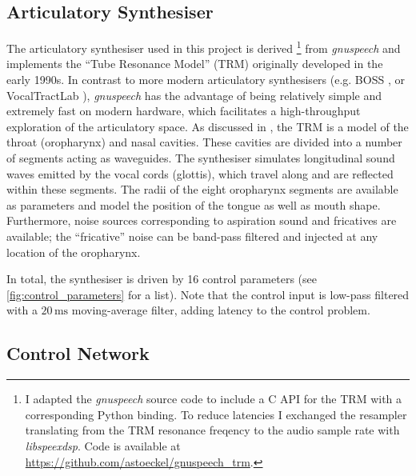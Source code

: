 \documentclass[letterpaper,10pt,conference]{ieeeconf}
\begin{document}
\subsection{Articulatory Synthesiser}

The articulatory synthesiser used in this project is derived%
\footnote{I adapted the \emph{gnuspeech} source code to include a C API for the TRM with a corresponding Python binding. To reduce latencies I exchanged the resampler translating from the TRM resonance freqency to the audio sample rate with \emph{libspeexdsp}. Code is available at \url{https://github.com/astoeckel/gnuspeech_trm}.}
from \emph{gnuspeech} \cite{hill1995realtime,hill2015gnuspeech} and implements the \enquote{Tube Resonance Model} (TRM) originally developed in the early 1990s. In contrast to more modern articulatory synthesisers (e.g. BOSS \cite{prom-on2013training}, or VocalTractLab \cite{birkholz2017vocaltractlab}), \emph{gnuspeech} has the advantage of being relatively simple and extremely fast on modern hardware, which facilitates a high-throughput exploration of the articulatory space. As discussed in \cite{manzara2005tube}, the TRM is a model of the throat (oropharynx) and nasal cavities. These cavities are divided into a number of segments acting as waveguides. The synthesiser simulates longitudinal sound waves emitted by the vocal cords (glottis), which travel along and are reflected within these segments. The radii of the eight oropharynx segments are available as parameters and model the position of the tongue as well as mouth shape. Furthermore, noise sources corresponding to aspiration sound and fricatives are available; the \enquote{fricative} noise can be band-pass filtered and injected at any location of the oropharynx.

In total, the synthesiser is driven by 16 control parameters (see \cref{fig:control_parameters} for a list). Note that the control input is low-pass filtered with a $20\,\mathrm{ms}$ moving-average filter, adding latency to the control problem.

\subsection{Control Network}
\end{document}
